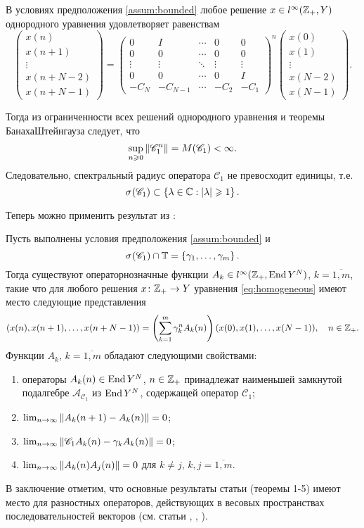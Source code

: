 В условиях предположения \ref{assum:bounded} любое решение $x \in l^\infty(\mathbb{Z}_+, Y)$ однородного уравнения удовлетворяет равенствам
\[
\begin{pmatrix}
x(n) \\
x(n + 1) \\
\vdots \\
x(n + N - 2) \\
x(n + N - 1)
\end{pmatrix}
=
\begin{pmatrix}
    0 & I  & \cdots & 0 & 0 \\
    0 & 0  & \cdots & 0 & 0 \\
    \vdots & \vdots & \ddots & \vdots & \vdots \\
    0 & 0 & \cdots & 0 & I \\
    -C_N & -C_{N-1} & \cdots & -C_2 & -C_1
   \end{pmatrix}^n
   \begin{pmatrix}
    x(0) \\
    x(1) \\
    \vdots \\
    x(N - 2) \\
    x(N - 1)
   \end{pmatrix}.
   \]

Тогда из ограниченности всех решений однородного уравнения и теоремы Банаха\-Штейнгауза следует, что
\[ \sup_{n\geqslant 0} \left\|\mathcal C_1^n\right\| = M(\mathcal C_1) < \infty.\]
Следовательно, спектральный радиус оператора $\mathcal C_1$ не превосходит единицы, т.е.
\[ \spectrum{\mathcal C_1} \subset \menge{\lambda \in \fieldc : \absv{\lambda} \geq 1}. \]

Теперь можно применить результат из \cite[теорема 1]{Bas15}:
\begin{theorem}\label{th:asymptotic}
    Пусть выполнены условия предположения \ref{assum:bounded} и 
    \[ \spectrum{\mathcal C_1} \cap \groupt = \menge{\gamma_1, \dotsc, \gamma_m}.\] 
    Тогда существуют операторнозначные функции $A_k \in l^\infty(\mathbb{Z}_+, \operatorname{End}{Y^N})$, $k = \overline{1,m}$, такие что для любого решения $x \colon \mathbb{Z}_+ \to Y$ уравнения \ref{eq:homogeneous} имеют место следующие представления
    \[ (x(n), x(n+1), \dotsc, x(n+N-1)) = \left(\sum_{k=1}^m \gamma_k^n A_k(n) \right) (x(0), x(1), \dotsc, x(N-1)), \quad n \in \mathbb{Z}_+. \]
    Функции $A_k$, $k = \overline{1,m}$ обладают следующими свойствами:
    \begin{enumerate}
    \item операторы $A_k(n) \in \operatorname{End}{Y^N}$, $n \in \mathbb{Z}_+$ принадлежат наименьшей замкнутой подалгебре $\mathcal A_{\mathcal C_1}$ из $\operatorname{End} Y^N$, содержащей оператор $\mathcal C_1$;
    \item $\lim_{n\to \infty} {\left\|A_k(n+1) - A_k(n)\right\|} = 0$;
    \item $\lim_{n\to \infty} {\left\|\mathcal C_1 A_k(n) - \gamma_k A_k(n)\right\|} = 0$;
    \item $\lim_{n\to \infty} {\left\|A_k(n) A_j(n)\right\|} = 0$ для $k \neq j$, $k, j = \overline{1,m}$.
    \end{enumerate}
\end{theorem}

В заключение отметим, что основные результаты статьи (теоремы 1-5) имеют место
для разностных операторов, действующих в весовых пространствах
последовательностей векторов (см. статьи \cite{Bic10}, \cite{Bic13}, \cite{Bic14}).
